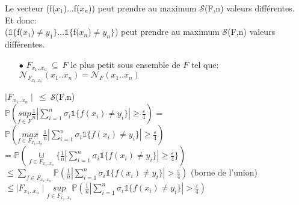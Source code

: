 \documentclass[a4paper]{report}
\begin{document}
Le vecteur (f($x_1$)...f($x_n$)) peut prendre au maximum $\mathcal{S}$(F,n) valeurs différentes.\\
\newline
Et donc:\\
($\mathds{1}\{$f($x_1$)$\neq y_1\}$...$\mathds{1}\{$f($x_n$)$\neq y_n\}$) peut prendre au maximum $\mathcal{S}$(F,n) valeurs différentes.\\
\newline
\begin{itemize}
\item[$\bullet$]$F_{x_1..x_n}\ \subseteq \ F$ le plus petit sous ensemble de $F$ tel que:\\
$\mathcal{N}_{F_{x_1..x_n}}(x_1..x_n) = \mathcal{N}_F(x_1..x_n)$\\
\end{itemize}
$\mid F_{x_1..x_n} \mid \ \leq \ \mathcal{S}$(F,n)\\
\newline
$ \mathds{P}(\underset{f\in F}{sup}\frac{1}{n}|\displaystyle {\sum_{i=1}^n}\sigma_i \mathds{1}\{f(x_i)\neq y_i\}|\geq \frac{\varepsilon}{4})$
= $\mathds{P}(\underset{f\in F_{x_1..x_n}}{max}\frac{1}{n}|\displaystyle {\sum_{i=1}^n}\sigma_i \mathds{1}\{f(x_i)\neq y_i\}|\geq \frac{\varepsilon}{4})$\\
= $\mathds{P}(\underset{f\in F_{x_1..x_n}}{\cup}\{\frac{1}{n}|\displaystyle {\sum_{i=1}^n}\sigma_i \mathds{1}\{f(x_i)\neq y_i\}|\geq \frac{\varepsilon}{4}\})$\\
$\leq \displaystyle {\sum_{f\in F_{x_1..x_n}}} \mathds{P}(\frac{1}{n}|\displaystyle {\sum_{i=1}^n}\sigma_i \mathds{1}\{f(x_i)\neq y_i\}|> \frac{\varepsilon}{4})$ (borne de l'union)\\
$\leq \mid F_{x_1..x_n} \mid \underset{f\in F_{x_1..x_n}}{sup} \mathds{P}(\frac{1}{n}|\displaystyle {\sum_{i=1}^n}\sigma_i \mathds{1}\{f(x_i)\neq y_i\}|> \frac{\varepsilon}{4}) $\\
\end{document}
